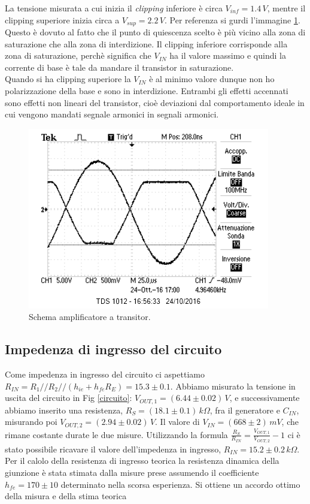 \documentclass[10pt,a4paper]{article}
\begin{document}
La tensione misurata a cui inizia il \emph{clipping} inferiore è circa $V_{inf} = 1.4 \,V$, mentre il clipping superiore inizia circa a $V_{sup} = 2.2 \, V$. Per referenza si gurdi l'immagine \ref{clipping}.\\
Questo è dovuto al fatto che il punto di quiescenza scelto è più vicino alla zona di saturazione che alla zona di interdizione. Il clipping inferiore corrisponde alla zona di saturazione, perchè significa che $V_{IN}$ ha il valore massimo e quindi la corrente di base è tale da mandare il transistor in saturazione.\\
Quando si ha clipping superiore la $V_{IN}$ è al minimo valore dunque non ho polarizzazione della base e sono in interdizione.
Entrambi gli effetti accennati sono effetti non lineari del transistor, cioè deviazioni dal comportamento ideale in cui vengono mandati segnale armonici in segnali armonici.\\

\begin{figure}[!htb]
  \centering
  \includegraphics[scale=1.0]{clipping.png}
\caption{Schema amplificatore a transitor.}
\label{clipping}
\end{figure}

\subsection{Impedenza di ingresso del circuito}
Come impedenza in ingresso del circuito ci aspettiamo $R_{IN}=R_1//R_2//(h_{ie}+h_{fe}R_E) = 15.3\pm0.1$.
Abbiamo misurato la tensione in uscita del circuito in Fig \ref{circuito}: $V_{OUT,1} = (6.44\pm0.02) \, V$, e successivamente abbiamo inserito una resistenza, $R_S= (18.1\pm0.1) \, k\Omega$, fra il generatore e $C_{IN}$, misurando poi $V_{OUT,2}= (2.94 \pm 0.02) \, V$. Il valore di $V_{IN} = (668 \pm 2) \, mV$, che rimane costante durate le due misure. Utilizzando la formula $\frac{R_S}{R_{IN}}=\frac{V_{OUT,1}}{V_{OUT,2}}-1$ ci è stato possibile ricavare il valore dell'impedenza in ingresso, $R_{IN}= 15.2\pm0.2\, k\Omega$. 
Per il calolo della resistenza di ingresso teorica la resistenza dinamica della giunzione è stata stimata dalla misure prese assumendo il coefficiente $h_{fe} = 170\pm10$ determinato nella scorsa esperienza. Si ottiene un accordo ottimo della misura e della stima teorica
\end{document}
